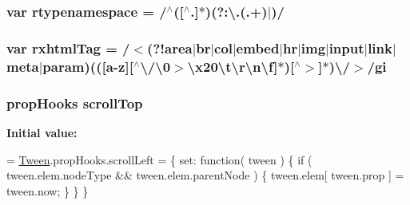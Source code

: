 \subsubsection[{\texorpdfstring{rtypenamespace}{rtypenamespace}}]{\setlength{\rightskip}{0pt plus 5cm}var rtypenamespace = /$^\wedge$(\mbox{[}$^\wedge$.\mbox{]}$\ast$)(?\+:\textbackslash{}.(.+)$\vert$)/}\hypertarget{jquery-3_82_81_8js_afb291ac94e65896487b460c56b3869dd}{}\label{jquery-3_82_81_8js_afb291ac94e65896487b460c56b3869dd}
\subsubsection[{\texorpdfstring{rxhtml\+Tag}{rxhtmlTag}}]{\setlength{\rightskip}{0pt plus 5cm}var rxhtml\+Tag = /$<$(?!area$\vert$br$\vert$col$\vert$embed$\vert$hr$\vert$img$\vert${\bf input}$\vert$link$\vert$meta$\vert${\bf param})((\mbox{[}a-\/z\mbox{]}\mbox{[}$^\wedge$\textbackslash{}/\textbackslash{}0$>$\textbackslash{}x20\textbackslash{}t\textbackslash{}r\textbackslash{}n\textbackslash{}f\mbox{]}$\ast$)\mbox{[}$^\wedge$$>$\mbox{]}$\ast$)\textbackslash{}/$>$/gi}\hypertarget{jquery-3_82_81_8js_ac84ce96a211608267d46261df079ee4e}{}\label{jquery-3_82_81_8js_ac84ce96a211608267d46261df079ee4e}
\subsubsection[{\texorpdfstring{scroll\+Top}{scrollTop}}]{ {\bf prop\+Hooks} scroll\+Top}\hypertarget{jquery-3_82_81_8js_a57beb1f611d6c8b84919b0f7d9e0e890}{}\label{jquery-3_82_81_8js_a57beb1f611d6c8b84919b0f7d9e0e890}
{\bfseries Initial value\+:}
\begin{DoxyCode}
= \hyperlink{jquery-3_82_81_8js_a91e55267cc469e865a6a7c6cfc51c7b1}{Tween}.propHooks.scrollLeft = \{
    \textcolor{keyword}{set}: \textcolor{keyword}{function}( tween ) \{
        \textcolor{keywordflow}{if} ( tween.elem.nodeType && tween.elem.parentNode ) \{
            tween.elem[ tween.prop ] = tween.now;
        \}
    \}
\}
\end{DoxyCode}
